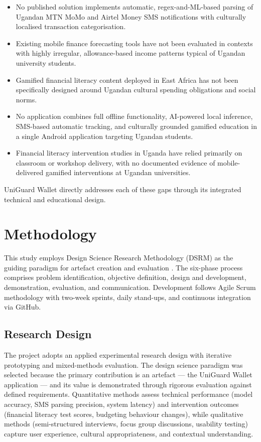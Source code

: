 \documentclass[12pt,a4paper]{report}
\begin{document}
\begin{itemize}
    \item No published solution implements automatic, regex-and-ML-based parsing of Ugandan MTN MoMo and Airtel Money SMS notifications with culturally localised transaction categorisation.
    \item Existing mobile finance forecasting tools have not been evaluated in contexts with highly irregular, allowance-based income patterns typical of Ugandan university students.
    \item Gamified financial literacy content deployed in East Africa has not been specifically designed around Ugandan cultural spending obligations and social norms.
    \item No application combines full offline functionality, AI-powered local inference, SMS-based automatic tracking, and culturally grounded gamified education in a single Android application targeting Ugandan students.
    \item Financial literacy intervention studies in Uganda have relied primarily on classroom or workshop delivery, with no documented evidence of mobile-delivered gamified interventions at Ugandan universities.
\end{itemize}

UniGuard Wallet directly addresses each of these gaps through its integrated technical and educational design.

\chapter{Methodology}

This study employs Design Science Research Methodology (DSRM) as the guiding
paradigm for artefact creation and evaluation \citep{Peffers2007}. The six-phase
process comprises problem identification, objective definition, design and development,
demonstration, evaluation, and communication. Development follows Agile Scrum
methodology with two-week sprints, daily stand-ups, and continuous integration via
GitHub.

\section{Research Design}

The project adopts an applied experimental research design with iterative prototyping
and mixed-methods evaluation. The design science paradigm was selected because the
primary contribution is an artefact --- the UniGuard Wallet application --- and its value
is demonstrated through rigorous evaluation against defined requirements. Quantitative
methods assess technical performance (model accuracy, SMS parsing precision, system
latency) and intervention outcomes (financial literacy test scores, budgeting behaviour
changes), while qualitative methods (semi-structured interviews, focus group
discussions, usability testing) capture user experience, cultural appropriateness, and
contextual understanding.
\end{document}
